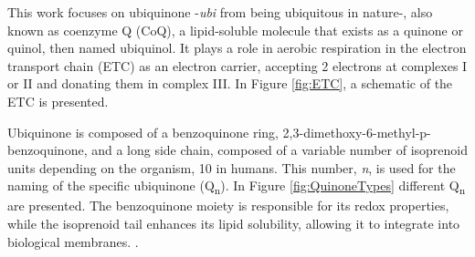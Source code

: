 This work focuses on ubiquinone -\textit{ubi} from being ubiquitous in nature-, also known as coenzyme Q (CoQ), a lipid-soluble molecule that exists as a quinone or quinol, then named ubiquinol. It plays a role in aerobic respiration in the electron transport chain (ETC) as an electron carrier, accepting 2 electrons at complexes I or II and donating them in complex III\cite{ernster1995biochemical}. In Figure \ref{fig:ETC}, a schematic of the ETC is presented.

Ubiquinone is composed of a benzoquinone ring, 2,3-dimethoxy-6-methyl-p-benzoquinone, and a long side chain, composed of a variable number of isoprenoid units depending on the organism, 10 in humans. This number, \textit{n}, is used for the naming of the specific ubiquinone (Q\textsubscript{n}). In Figure \ref{fig:QuinoneTypes} different Q\textsubscript{n} are presented. The benzoquinone moiety is responsible for its redox properties, while the isoprenoid tail enhances its lipid solubility, allowing it to integrate into biological membranes. \cite{ernster1995biochemical}.


